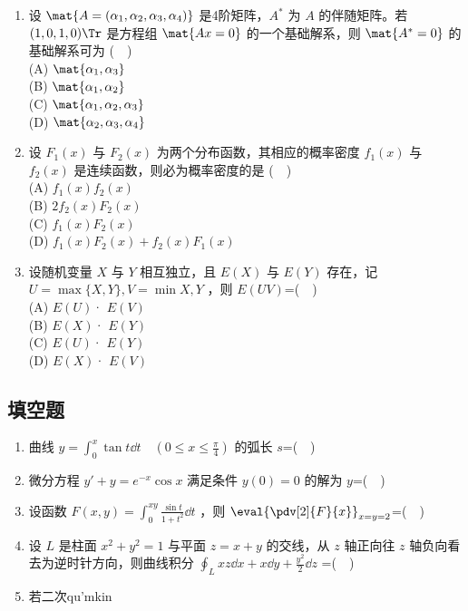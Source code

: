 \begin{enumerate}
(D) $\mat {P_2,P_1^{-1}}$
\item  设 $\mat{A=(\alpha_1,\alpha_2,\alpha_3,\alpha_4)}$ 是4阶矩阵，$A^*$  为 $A$ 的伴随矩阵。若 $(1,0,1,0) \Tr$ 是方程组 $\mat {Ax=0}$ 的一个基础解系，则 $\mat {A^*=0}$ 的基础解系可为 ($\quad$)\\
(A) $\mat {\alpha_1,\alpha_3}$\\
(B) $\mat {\alpha_1,\alpha_2}$\\
(C) $\mat {\alpha_1,\alpha_2,\alpha_3}$\\
(D) $\mat {\alpha_2,\alpha_3,\alpha_4}$
\item  设 $F_1(x)$ 与 $F_2(x)$ 为两个分布函数，其相应的概率密度 $f_1(x)$ 与 $f_2(x)$ 是连续函数，则必为概率密度的是 ($\quad$)\\
(A) $f_1(x)f_2(x)$\\
(B)  $2f_2(x)F_2(x)$\\
(C) $f_1(x)F_2(x)$\\
(D) $f_1(x)F_2(x)+f_2(x)F_1(x)$
\item 设随机变量 $X$ 与 $Y$ 相互独立，且 $E(X)$ 与 $E(Y)$ 存在，记 $U=\max \{X,Y\},V=\min {X,Y}$ ，则 $E(UV)$=($\quad$)\\
(A) $E(U)$· $E(V)$\\
(B)  $E(X)$· $E(Y)$\\
(C) $E(U)$· $E(Y)$\\
(D) $E(X)$· $E(V)$\\
\end{enumerate}
\subsection{填空题}
\begin{enumerate}
\item 曲线 $y=\int_{0}^{x} \tan t\dd{t} \quad (0 \le x \le \frac{\pi}{4})$  的弧长 $s$=($\quad$) 
\item 微分方程 $y'+y=e^{-x}\cos x$ 满足条件 $y(0)=0$  的解为 $y$=($\quad$) 
\item  设函数 $\displaystyle F(x,y)=\int_0^{xy} \frac{\sin t}{1+t^2}\dd{t}$ ，则 $\displaystyle {\eval{ \pdv[2]{F}{x}}_{x=y=2}}$=($\quad$)
\item  设 $L$ 是柱面 $x^2+y^2=1$ 与平面 $z=x+y$ 的交线，从 $z$ 轴正向往 $z$ 轴负向看去为逆时针方向，则曲线积分 $\displaystyle \oint_L xz\dd{x}+x\dd{y}+\frac{y^2}{2}\dd{z}$ =($\quad$)
\item  若二次qu'mkin
\end{enumerate}
